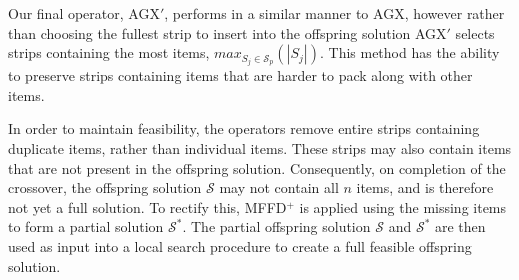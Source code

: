 \documentclass{elsarticle}
\begin{document}
Our final operator, AGX$'$, performs in a similar manner to AGX, however rather than choosing the fullest strip to insert into the offspring solution AGX$'$ selects strips containing the most items, $max_{S_j \in \mathcal{S}_p} (|S_j|)$. This method has the ability to preserve strips containing items that are harder to pack along with other items. 

In order to maintain feasibility, the operators remove entire strips containing duplicate items, rather than individual items. These strips may also contain items that are not present in the offspring solution. Consequently, on completion of the crossover, the offspring solution $\mathcal{S}$ may not contain all $n$ items, and is therefore not yet a full solution. To rectify this, MFFD$^+$ is applied using the missing items to form a partial solution $\mathcal{S}^*$. The partial offspring solution $\mathcal{S}$ and $\mathcal{S}^*$ are then used as input into a local search procedure to create a full feasible offspring solution.
\end{document}
